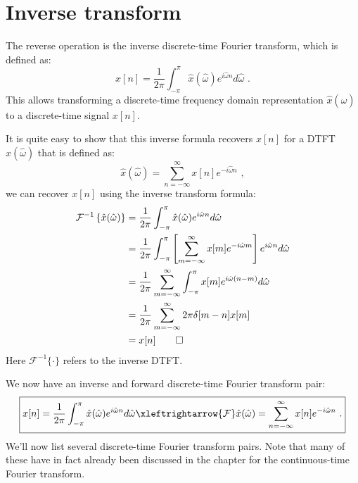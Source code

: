 \section{Inverse transform}
The reverse operation is the inverse discrete-time Fourier transform,
which is defined as:
\begin{equation}
\boxed{
x[n] = \frac{1}{2\pi}\int_{-\pi}^{\pi} \hat{x}(\hat{\omega})e^{i\hat{\omega}n} d\hat{\omega}\,\,.
\label{eq:idtft_def}
}
\end{equation}
This allows transforming a discrete-time frequency domain
representation $\hat{x}(\hat{\omega})$ to a discrete-time signal $x[n]$.

It is quite easy to show that this inverse formula recovers $x[n]$ for
a DTFT $\hat{x}(\hat{\omega})$ that is defined as:
\begin{equation}
\hat{x}(\hat{\omega}) = \sum_{n=-\infty}^{\infty} x[n] e^{-i\hat{\omega} n}\,\,,
\end{equation}
we can recover $x[n]$ using the inverse transform formula:
\begin{align}
\mathcal{F}^{-1}\left\{\hat{x}(\hat{\omega})\right\} &=\frac{1}{2\pi}\int_{-\pi}^{\pi} \hat{x}(\hat{\omega})e^{i\hat{\omega}n} d\hat{\omega} \\
     &=\frac{1}{2\pi}\int_{-\pi}^{\pi} \left[\sum_{m=-\infty}^{\infty} x[m]e^{-i\hat{\omega}m} \right] e^{i\hat{\omega}n} d\hat{\omega}\\
     &=\frac{1}{2\pi}\sum_{m=-\infty}^{\infty} \int_{-\pi}^{\pi} x[m]e^{i\hat{\omega}(n-m)} d\hat{\omega}\\
     &=\frac{1}{2\pi}\sum_{m=-\infty}^{\infty} 2\pi \delta[m-n] x[m]\\
     &=x[n]\qed
\end{align}
Here $\mathcal{F}^{-1}\{\cdot\}$ refers to the inverse DTFT.

We now have an inverse and forward discrete-time Fourier transform pair:
\begin{equation}
  \boxed{
    x[n] = \frac{1}{2\pi}\int_{-\pi}^{\pi} \hat{x}(\hat{\omega})e^{i\hat{\omega}n} d\hat{\omega} \xleftrightarrow{\mathcal{F}} 
    \hat{x}(\hat{\omega}) = \sum_{n=-\infty}^{\infty} x[n] e^{-i\hat{\omega}n}\,\,.
    }
\end{equation}
We'll now list several discrete-time Fourier transform pairs. Note
that many of these have in fact already been discussed in the chapter
for the continuous-time Fourier transform.

